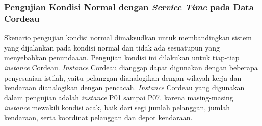 \subsubsection{Pengujian Kondisi Normal dengan \textit{Service Time} pada Data Cordeau}
\label{ssec:test-normal-service-time-cordeau}
Skenario pengujian kondisi normal dimaksudkan untuk membandingkan sistem yang dijalankan pada kondisi normal dan tidak ada sesuatupun yang menyebabkan penundaaan. Pengujian kondisi ini dilakukan untuk tiap-tiap \textit{instance} Cordeau. \textit{Instance} Cordeau dianggap dapat digunakan dengan beberapa penyesuaian istilah, yaitu pelanggan dianalogikan dengan wilayah kerja dan kendaraan dianalogikan dengan pencacah. \textit{Instance} Cordeau yang digunakan dalam pengujian adalah \textit{instance} P01 sampai P07, karena masing-masing \textit{instance} mewakili kondisi acak, baik dari segi jumlah pelanggan, jumlah kendaraan, serta koordinat pelanggan dan depot kendaraan.


